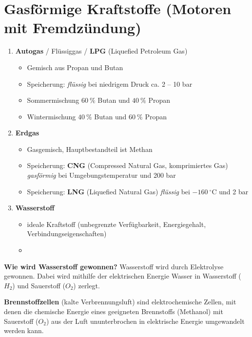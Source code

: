 \section{Gasförmige Kraftstoffe (Motoren mit
Fremdzündung)}\label{gasfoermige-kraftstoffe-motoren-mit-fremdzuendung}

\begin{enumerate}
\item
  \textbf{Autogas} / Flüssiggas / \textbf{LPG} (Liquefied Petroleum Gas)

  \begin{itemize}
  \item
    Gemisch aus Propan und Butan
  \item
    Speicherung: \emph{flüssig} bei niedrigem Druck ca. 2 -- 10 bar
  \item
    Sommermischung $60~\%$ Butan und $40~\%$ Propan
  \item
    Wintermischung $40~\%$ Butan und $60~\%$ Propan
  \end{itemize}
\item
  \textbf{Erdgas}

  \begin{itemize}
  \item
    Gasgemisch, Hauptbestandteil ist Methan
  \item
    Speicherung: \textbf{CNG} (Compressed Natural Gas, komprimiertes
    Gas) \emph{gasförmig} bei Umgebungstemperatur und 200 bar
  \item
    Speicherung: \textbf{LNG} (Liquefied Natural Gas) \emph{flüssig} bei
    $- 160~^\circ\text{C}$ und 2 bar
  \end{itemize}
\item
  \textbf{Wasserstoff}

  \begin{itemize}
  \item
    ideale Kraftstoff (unbegrenzte Verfügbarkeit, Energiegehalt,
    Verbindungseigenschaften)
  \item
  \end{itemize}
\end{enumerate}

\textbf{Wie wird Wasserstoff gewonnen?} Wasserstoff wird durch
Elektrolyse gewonnen. Dabei wird mithilfe der elektrischen Energie
Wasser in Wasserstoff ($H_2$) und Sauerstoff ($O_2$) zerlegt.

\textbf{Brennstoffzellen} (kalte Verbrennungsluft) sind elektrochemische
Zellen, mit denen die chemische Energie eines geeigneten Brennstoffs
(Methanol) mit Sauerstoff ($O_2$) aus der Luft ununterbrochen in
elektrische Energie umgewandelt werden kann.

